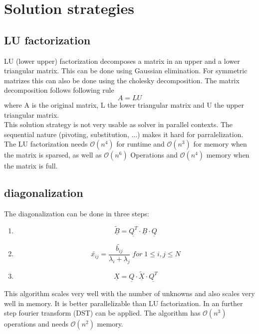 \documentclass{article}
\begin{document}
\section{Solution strategies}
\subsection{LU factorization}
LU (lower upper) factorization decomposes a matrix in an upper and a lower triangular matrix. This can be done using Gaussian elimination. For symmetric matrizes this can also be done using the cholesky decomposition. The matrix decomposition follows following rule
\begin{equation}
A=LU
\end{equation}
where A is the original matrix, L the lower triangular matrix and U the upper triangular matrix.\\
This solution strategy is not very usable as solver in parallel contexts. The sequential nature (pivoting, substitution, ...) makes it hard for parralelization. The LU factorization needs $\mathcal{O}(n^4)$ for runtime and $\mathcal{O}(n^3)$ for memory when the matrix is sparsed, as well as $\mathcal{O}(n^6)$ Operations and $\mathcal{O}(n^4)$ memory when the matrix is full.
\subsection{diagonalization}
The diagonalization can be done in three steps:
\begin{enumerate}
\item $$\underline{\tilde{B}}=\underline{Q^T}\cdot\underline{B}\cdot\underline{Q}$$
\item $$\tilde{x_{ij}}=\frac{\tilde{b_{ij}}}{\lambda_i+\lambda_j}\;for\;1\leq i,j \leq N$$
\item $$\underline{X}=\underline{Q}\cdot\underline{\tilde{X}}\cdot\underline{Q^T}$$
\end{enumerate}
This algorithm scales very well with the number of unknowns and also scales very well in memory. It is better parallelizable than LU factorization. In an further step fourier transform (DST) can be applied. The algorithm has $\mathcal{O}(n^3)$ operations and needs $\mathcal{O}(n^2)$ memory.
\end{document}
